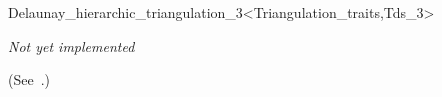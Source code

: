 

\begin{ccRefClass}{Delaunay_hierarchic_triangulation_3<Triangulation_traits,Tds_3>}  %


\textit{Not yet implemented}

\ccDefinition

(See~\cite{d-iirdt-98}.)
















\end{ccRefClass}


